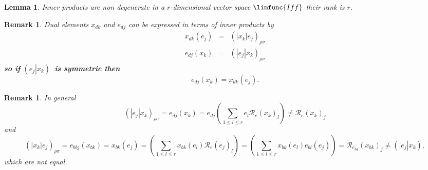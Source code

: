 \documentclass[aps,preprint]{revtex4}
\newtheorem{lemma}[theorem]{Lemma}
\newtheorem{remark}[theorem]{Remark}
\begin{document}
\begin{lemma}
Inner products are non degenerate in a $r$-dimensional vector space $%
\limfunc{Iff}$ their \emph{rank} is $r.$
\end{lemma}

\begin{remark}
Dual elements $x_{dk}$ and $e_{dj}$ can be expressed in terms of inner
products by 
\begin{eqnarray}
x_{dk}\left( e_{j}\right) &=&\left( \left\vert x_{k}\right\vert e_{j}\right)
_{\rho \sigma } \\
e_{dj}\left( x_{k}\right) &=&\left( \left\vert e_{j}\right\vert x_{k}\right)
_{\rho \sigma }
\end{eqnarray}%
\textbf{so if }$\left( \left. e_{j}\right\vert x_{k}\right) $\textbf{\ is
symmetric then }%
\begin{equation}
e_{dj}\left( x_{k}\right) =x_{dk}\left( e_{j}\right) .
\end{equation}
\end{remark}

\begin{remark}
In general 
\begin{equation}
\left( \left\vert e_{j}\right\vert x_{k}\right) _{\rho \sigma }=e_{dj}\left(
x_{k}\right) =e_{dj}\left( \sum_{1\leq l\leq r}e_{l}\mathcal{R}_{e}\left(
x_{k}\right) _{l}\right) \neq \mathcal{R}_{e}\left( x_{k}\right) _{j}
\end{equation}%
and 
\begin{equation}
\left( \left\vert x_{k}\right\vert e_{j}\right) _{\rho \sigma
}=e_{bbj}\left( x_{bk}\right) =x_{bk}\left( e_{j}\right) =\left( \sum_{1\leq
l\leq r}x_{bk}\left( e_{l}\right) \mathcal{R}_{e}\left( e_{j}\right)
_{l}\right) =\left( \sum_{1\leq l\leq r}x_{bk}\left( e_{l}\right)
e_{bl}\left( e_{j}\right) \right) =\mathcal{R}_{e_{bd}}\left( x_{bk}\right)
_{j}\neq \left( \left\vert e_{j}\right\vert x_{k}\right) ,
\end{equation}%
\emph{which are not equal}.
\end{remark}
\end{document}
